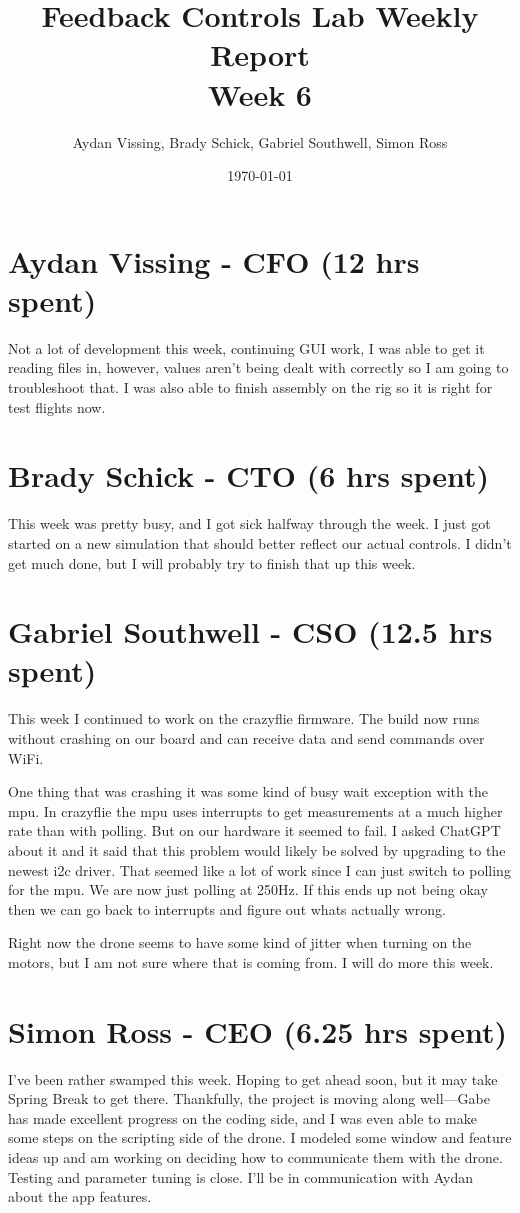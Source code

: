 \documentclass[12pt, titlepage]{article}
\title{Feedback Controls Lab Weekly Report \\ \normalsize{Week 6}}
\author{Aydan Vissing, Brady Schick, Gabriel Southwell, Simon Ross}
\date{\today}
\begin{document}
\maketitle

\section*{Aydan Vissing - CFO (12 hrs spent)}

Not a lot of development this week, continuing GUI work, I was able to get it reading files in, however, values aren't being dealt with correctly so I am going to troubleshoot that. I was also able to finish assembly on the rig so it is right for test flights now.

\section*{Brady Schick - CTO (6 hrs spent)}

This week was pretty busy, and I got sick halfway through the week. I just got started on a new simulation that should better reflect our actual controls. I didn't get much done, but I will probably try to finish that up this week.

\section*{Gabriel Southwell - CSO (12.5 hrs spent)}

This week I continued to work on the crazyflie firmware. The build now runs without crashing on our board and can receive data and send commands over WiFi. 

One thing that was crashing it was some kind of busy wait exception with the mpu. In crazyflie the mpu uses interrupts to get measurements at a much higher rate than with polling. But on our hardware it seemed to fail. I asked ChatGPT about it and it said that this problem would likely be solved by upgrading to the newest i2c driver. That seemed like a lot of work since I can just switch to polling for the mpu. We are now just polling at 250Hz. If this ends up not being okay then we can go back to interrupts and figure out whats actually wrong.

Right now the drone seems to have some kind of jitter when turning on the motors, but I am not sure where that is coming from. I will do more this week.


\section*{Simon Ross - CEO (6.25 hrs spent)}

I've been rather swamped this week. Hoping to get ahead soon, but it may take Spring Break to get there. Thankfully, the project is moving along well---Gabe has made excellent progress on the coding side, and I was even able to make some steps on the scripting side of the drone. I modeled some window and feature ideas up and am working on deciding how to communicate them with the drone. Testing and parameter tuning is close. I'll be in communication with Aydan about the app features.
\end{document}
